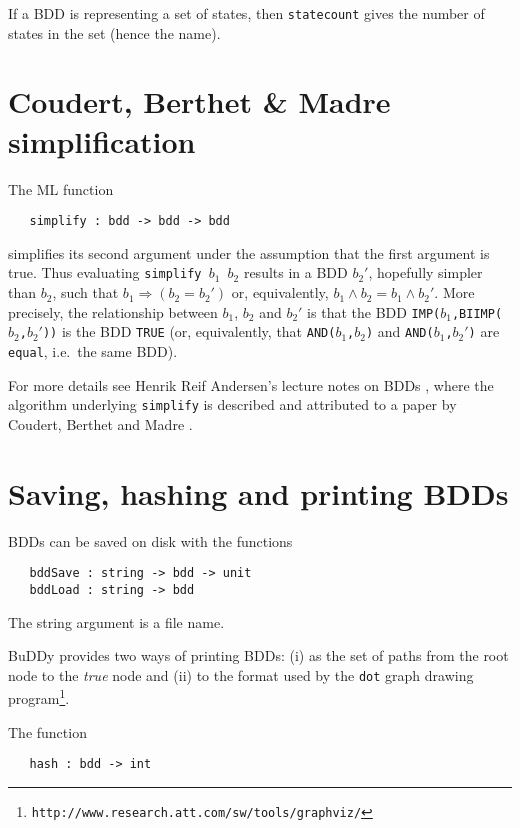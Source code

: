 \documentclass[12pt]{article}
\newcommand{\bnind}[1]{\index[MLbn]{\texttt{#1}}}
\renewcommand{\t}[1]{\mbox{\tt #1}}
\newcommand{\Buddy}{BuDDy\xspace}
\newcommand{\Imp}{\Rightarrow}
\begin{document}
If a BDD is representing a set of states, then \t{statecount} gives
the number of states in the set (hence the name).


\section{Coudert, Berthet \& Madre simplification}

The ML function

\begin{verbatim}
   simplify : bdd -> bdd -> bdd
\end{verbatim}\bnind{simplify}

simplifies its second argument under the assumption that the first
argument is true. Thus evaluating
\t{simplify~$b_1$~$b_2$} results in a BDD $b_2'$, hopefully simpler than $b_2$, such that
$b_1 \Imp (b_2 = b_2')$ or, equivalently, \mbox{$b_1 \wedge b_2 = b_1 \wedge b_2'$}.
More precisely,
the relationship between $b_1$, $b_2$ and $b_2'$ is that
the BDD \t{IMP($b_1$,BIIMP($b_2$,$b_2'$))} is the BDD \t{TRUE}
(or, equivalently, that \t{AND($b_1$,$b_2$)} and \t{AND($b_1$,$b_2'$)}
are \t{equal}, i.e.~the same BDD).

For more details see Henrik Reif Andersen's lecture
notes on BDDs \cite{HenrikNotes}, where
the algorithm underlying \t{simplify} is described and attributed to a paper by
Coudert, Berthet and Madre \cite{CoudertBerthetMadre}.

\section{Saving, hashing and printing BDDs}\label{printing}

BDDs can be saved on disk with the functions

\begin{verbatim}
   bddSave : string -> bdd -> unit
   bddLoad : string -> bdd
\end{verbatim}\bnind{bddSave}\bnind{bddLoad}

The string argument is a file name.

\Buddy{} provides two ways of printing BDDs: (i) as the set of paths from
the root node to the {\it{true}} node and (ii) to the format used by
the \t{dot} graph drawing
program\footnote{\tt{http://www.research.att.com/sw/tools/graphviz/}}.

The function

\begin{verbatim}
   hash : bdd -> int
\end{verbatim}\bnind{hash}
\end{document}
